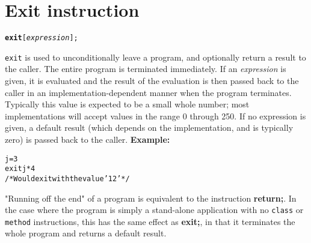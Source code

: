 \chapter{Exit instruction}\label{refexit}
\begin{shaded}
\begin{alltt}
\textbf{exit} [\emph{expression}];
\end{alltt}
\end{shaded}
 \texttt{exit} is used to unconditionally leave a program, and
optionally return a result to the caller.
The entire program is terminated immediately.
 If an \emph{expression} is given, it is evaluated and the result
of the evaluation is then passed back to the caller in an
implementation-dependent manner when the program terminates.
Typically this value is expected to be a small whole number; most
implementations will accept values in the range 0 through 250.
If no expression is given, a default result (which depends on the
implementation, and is typically zero) is passed back to the caller.
 \textbf{Example:}
\begin{alltt}
j=3
exit j*4
/* Would exit with the value '12' */
\end{alltt}
 "Running off the end" of a program is equivalent to the
instruction \textbf{return;}.  In the case where the program is simply
a stand-alone application with no \texttt{class} or \texttt{method}
instructions, this has the same effect as \textbf{exit;}, in that it
terminates the whole program and returns a default result.
